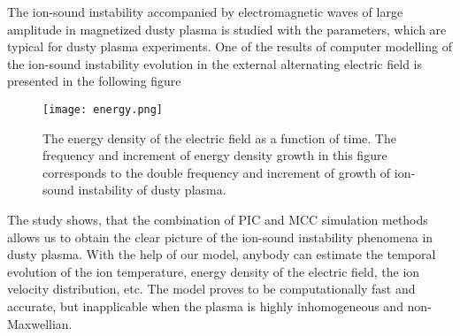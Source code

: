 \documentclass[twocolumn, prd, nobalancelastpage, superscriptaddress]{revtex4}
\newcommand{\alarm}[1]{\textcolor{red}{#1}}
\newcommand{\maybe}[1]{\textcolor{orange}{#1}}
\newcommand{\bs}{\boldsymbol}
\begin{document}



The ion-sound instability accompanied by electromagnetic waves of large amplitude in magnetized dusty plasma is studied with the parameters, which are typical for dusty plasma experiments. One of the results of computer modelling of the ion-sound instability evolution in the external alternating electric field is presented in the following figure

\begin{figure}[h]\label{fig:energy}
    \centering
    \texttt{[image: energy.png]}
    \caption{The energy density of the electric field as a function of time. The frequency and increment of energy density growth in this figure corresponds to the double frequency and increment of growth of ion-sound instability of dusty plasma.}
\end{figure} 


The study shows, that the combination of PIC and MCC simulation methods allows us to obtain the clear picture of the ion-sound instability phenomena in dusty plasma. With the help of our model, anybody can estimate the temporal evolution of the ion temperature, energy density of the electric field, the ion velocity distribution, etc. The model proves to be computationally fast and accurate, but inapplicable when the plasma is highly inhomogeneous and non-Maxwellian.
\end{document}
